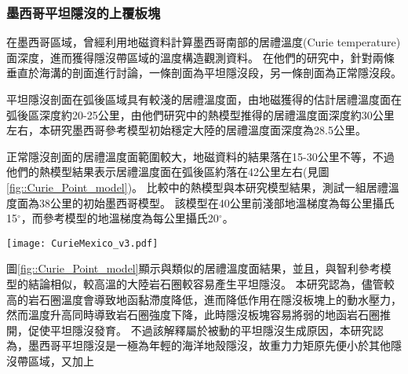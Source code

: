 
\subsubsection{墨西哥平坦隱沒的上覆板塊}
在墨西哥區域，\citet{Manea2011Curie}曾經利用地磁資料計算墨西哥南部的居禮溫度(Curie temperature)面深度，進而獲得隱沒帶區域的溫度構造觀測資料。
在他們的研究中，針對兩條垂直於海溝的剖面進行討論，一條剖面為平坦隱沒段，另一條剖面為正常隱沒段。

平坦隱沒剖面在弧後區域具有較淺的居禮溫度面，由地磁獲得的估計居禮溫度面在弧後區深度約20-25公里，由他們研究中的熱模型推得的居禮溫度面深度約30公里左右，本研究墨西哥參考模型初始穩定大陸的居禮溫度面深度為28.5公里。

正常隱沒剖面的居禮溫度面範圍較大，地磁資料的結果落在15-30公里不等，不過他們的熱模型結果表示居禮溫度面在弧後區約落在42公里左右(見圖\ref{fig::Curie_Point_model})。
比較\citet{Manea2011Curie}中的熱模型與本研究模型結果，測試一組居禮溫度面為38公里的初始墨西哥模型。
該模型在40公里前淺部地溫梯度為每公里攝氏15$^\circ$，而參考模型的地溫梯度為每公里攝氏20$^\circ$。

\begin{figure*}[ht!]
    \centering
    \texttt{[image: CurieMexico\_v3.pdf]}
    \caption[墨西哥兩條剖面的居禮溫度面與熱構造模型與不同地溫梯度的墨西哥模型在30 Myr的隱沒板塊構造與580$^\circ$等溫線]{(a)(b)(d)(e)墨西哥兩條剖面的居禮溫度面與熱構造模型，摘自\citet{Manea2011Curie}。(c)(f)不同地溫梯度的墨西哥模型在30 Myr的隱沒板塊構造(黑線)於100公里以上之剖面與580$^\circ$等溫線(橘線)，幾何形狀取自隱沒板塊頂部，使用5公里移動平均平滑離散化的網格。(a)繪出平坦隱沒區域的居禮溫度面(紅線，虛線為外差值)、隱沒板塊頂部(黑線)與\citet{Manea2011Curie}中熱模型攝氏580$^\circ$等溫線。(b)\citet{Manea2011Curie}的平坦隱沒熱模型。(c)墨西哥參考模型在30 Myr的隱沒板塊構造(黑線)於100公里以上之剖面與580$^\circ$等溫線(橘線)。(d)繪出正常隱沒區域的居禮溫度面(藍線)、隱沒板塊頂部(黑線)與\citet{Manea2011Curie}中熱模型攝氏580$^\circ$等溫線。(e)\citet{Manea2011Curie}的正常隱沒熱模型。(f)測試一組於地表至40公里中每公里攝氏15$^\circ$的模型。模型於30 Myr的隱沒板塊構造(黑線)於100公里以上之剖面與580$^\circ$等溫線(橘線)。
    }
    \label{fig::Curie_Point_model}
\end{figure*}

圖\ref{fig::Curie_Point_model}顯示與\citet{Manea2011Curie}類似的居禮溫度面結果，並且，與智利參考模型的結論相似，較高溫的大陸岩石圈較容易產生平坦隱沒。
本研究認為，儘管較高的岩石圈溫度會導致地函黏滯度降低，進而降低作用在隱沒板塊上的動水壓力，然而溫度升高同時導致岩石圈強度下降，此時隱沒板塊容易將弱的地函岩石圈推開，促使平坦隱沒發育。
不過該解釋屬於被動的平坦隱沒生成原因，本研究認為，墨西哥平坦隱沒是一極為年輕的海洋地殼隱沒，故重力力矩原先便小於其他隱沒帶區域，又加上


